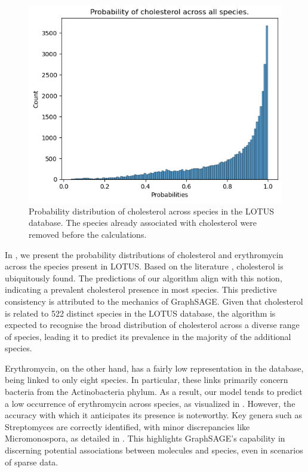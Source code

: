 \documentclass[
11pt, %
oneside, %
english, %
singlespacing, %
headsepline, %
chapterinoneline, %
]{MastersDoctoralThesis} %
\begin{document}
\begin{figure}[h]
	\centering
	\includegraphics[scale=0.7]{figure/cholesterol}
	\caption{Probability distribution of cholesterol across species in the LOTUS database. The species already associated with cholesterol were removed before the calculations.}
	\label{fig: hist cholesterol}
\end{figure}

In , we present the probability distributions of cholesterol and erythromycin across the species present in LOTUS. Based on the literature \cite{o2013merck, international1979iarc}, cholesterol is ubiquitously found. The predictions of our algorithm align with this notion, indicating a prevalent cholesterol presence in most species. This predictive consistency is attributed to the mechanics of GraphSAGE. Given that cholesterol is related to 522 distinct species in the LOTUS database, the algorithm is expected to recognise the broad distribution of cholesterol across a diverse range of species, leading it to predict its prevalence in the majority of the additional species.

Erythromycin, on the other hand, has a fairly low representation in the database, being linked to only eight species. In particular, these links primarily concern bacteria from the Actinobacteria phylum. As a result, our model tends to predict a low occurrence of erythromycin across species, as visualized in . However, the accuracy with which it anticipates its presence is noteworthy. Key genera such as Streptomyces are correctly identified, with minor discrepancies like Micromonospora, as detailed in . This highlights GraphSAGE's capability in discerning potential associations between molecules and species, even in scenarios of sparse data. 
\end{document}

